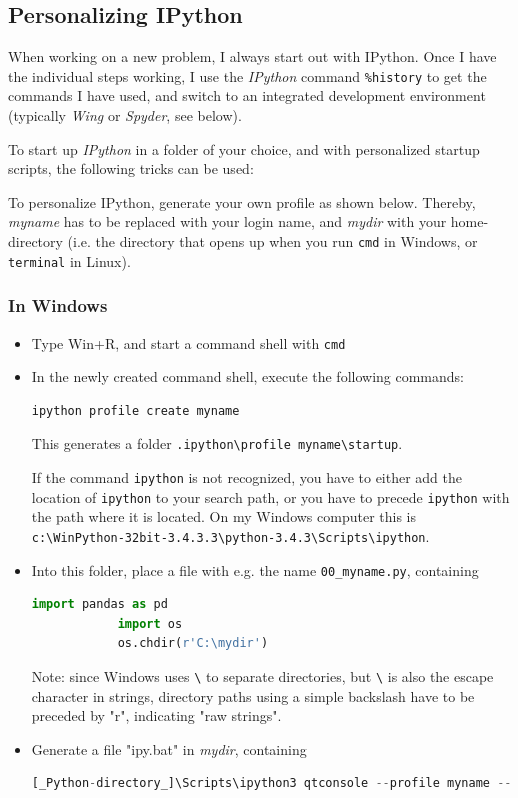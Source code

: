 \subsection{Personalizing IPython}

When working on a new problem, I always start out with IPython. Once
I have the individual steps working, I use the \emph{IPython} command \lstinline{%history} to get the commands I have used, and switch to an integrated development environment (typically \emph{Wing} or \emph{Spyder}, see below).

To start up \emph{IPython} in a folder of your choice, and with personalized startup scripts, the following tricks can be used:

To personalize IPython, generate your own profile as shown below. Thereby, \emph{myname} has to be replaced with your login name, and \emph{mydir} with your home-directory (i.e. the directory that opens up when you run \lstinline{cmd} in Windows, or \lstinline{terminal} in Linux).

\subsubsection{In Windows}

\begin{itemize}
  \item Type Win+R, and start a command shell with \lstinline{cmd}
  \item In the newly created command shell, execute the following commands:
        \begin{lstlisting}[language=Python]
            ipython profile create myname
        \end{lstlisting}
        This generates a folder \lstinline{.ipython\profile myname\startup}.

        If the command \lstinline{ipython} is not recognized, you have to either add the location of \lstinline{ipython} to your search path, or you have to precede \lstinline{ipython} with the path where it is located. On my Windows computer this is \lstinline{c:\WinPython-32bit-3.4.3.3\python-3.4.3\Scripts\ipython}.

  \item Into this folder, place a file with e.g. the name \lstinline{00_myname.py}, containing
        \begin{lstlisting}[language=Python]
            import pandas as pd
            import os
            os.chdir(r'C:\mydir')
        \end{lstlisting}
        Note: since Windows uses \lstinline{\} to separate directories, but \lstinline{\} is also the escape character in strings, directory paths using a simple backslash have to be preceded by "r", indicating "raw strings".
  \item Generate a file "ipy.bat" in \emph{mydir}, containing
      \begin{lstlisting}[language=Python]
      [_Python-directory_]\Scripts\ipython3 qtconsole --profile myname --pylab=inline
      \end{lstlisting}
\end{itemize}

